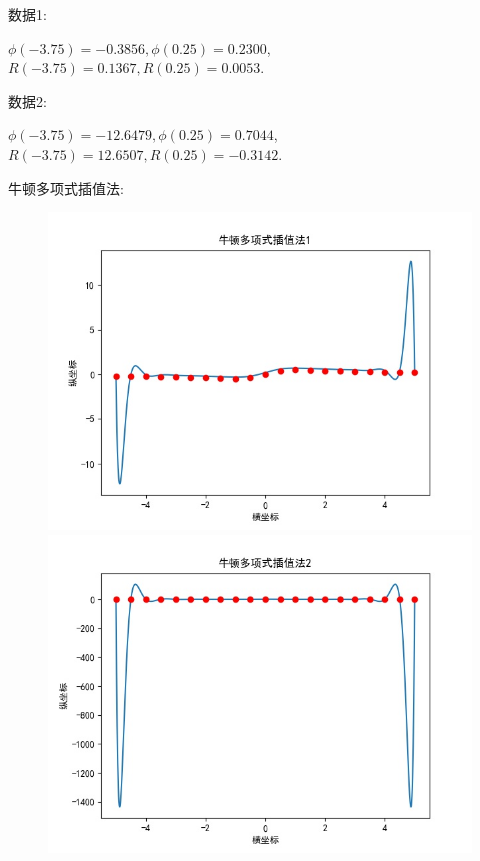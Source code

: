 \documentclass[UTF8]{ctexart}
\begin{document}
数据1:

$\phi(-3.75) = -0.3856 ,\phi(0.25) = 0.2300$,$R(-3.75)= 0.1367, R(0.25) = 0.0053$.

数据2:

$\phi(-3.75) = -12.6479 ,\phi(0.25) = 0.7044$,$R(-3.75)= 12.6507, R(0.25) = -0.3142$.


\quad

牛顿多项式插值法:
\begin{figure}[h]
    \centering
    \begin{minipage}[t]{0.4\linewidth}
    \includegraphics[width=\linewidth]{NT1.jpg}
    \end{minipage}%
    \begin{minipage}[t]{0.4\linewidth}
    \includegraphics[width=\linewidth]{NT2.jpg}
    \end{minipage}
\end{figure}
\end{document}

